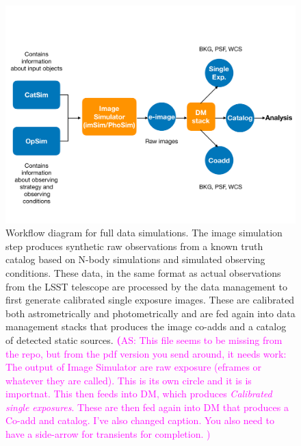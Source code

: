 \documentclass[twocolumn]{aastex62}
\newcommand{\as}[1]{{\textcolor{magenta}{{\textbf (AS: #1)}}}}
\begin{document}
\begin{figure}
\centering
 \includegraphics[trim={0cm 1.25cm 0cm 4.05cm}, clip, width=1.0\columnwidth]{dc1_workflow}
\caption{Workflow diagram for full data simulations. The image simulation step produces synthetic raw observations from a known truth catalog based on N-body simulations and simulated observing conditions. These data, in the same format as actual observations from the LSST telescope are processed by the data management to first generate calibrated single exposure images. These are calibrated both astrometrically and photometrically and are fed again into data management stacks that produces the image co-adds and a catalog of detected static sources.
  \as{This file seems to be missing from the repo, but from the pdf version
    you send around, it needs work: The output of Image Simulator are raw exposure (eframes or whatever they are called). This is its own circle and it is is importnat. This then feeds into DM, which produces \emph{Calibrated single exposures}. These are then fed again into DM that produces a Co-add and catalog. I've also changed caption. You also need to have a side-arrow for transients for completion. }
}

\label{fig:dc1_workflow}
\end{figure}
\end{document}

